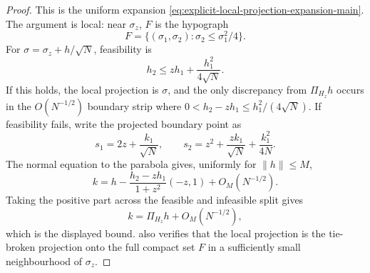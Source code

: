\begin{proof}
This is the uniform expansion
\eqref{eq:explicit-local-projection-expansion-main}.  The argument is local:
near \(\sigma_z\), \(F\) is the hypograph
\[
F=\{(\sigma_1,\sigma_2):\sigma_2\le \sigma_1^2/4\}.
\]
For \(\sigma=\sigma_z+h/\sqrt N\), feasibility is
\[
h_2\le zh_1+\frac{h_1^2}{4\sqrt N}.
\]
If this holds, the local projection is \(\sigma\), and the only discrepancy
from \(\Pi_{H_z}h\) occurs in the \(O(N^{-1/2})\) boundary strip where
\(0<h_2-zh_1\le h_1^2/(4\sqrt N)\).  If feasibility fails, write the projected
boundary point as
\[
s_1=2z+\frac{k_1}{\sqrt N},\qquad
s_2=z^2+\frac{zk_1}{\sqrt N}+\frac{k_1^2}{4N}.
\]
The normal equation to the parabola gives, uniformly for \(\|h\|\le M\),
\[
k
=h-\frac{h_2-zh_1}{1+z^2}(-z,1)+O_M(N^{-1/2}).
\]
Taking the positive part across the feasible and infeasible split gives
\[
k=\Pi_{H_z}h+O_M(N^{-1/2}),
\]
which is the displayed bound.  
also verifies that the local projection is the tie-broken projection onto the
full compact set \(F\) in a sufficiently small neighbourhood of \(\sigma_z\).
\end{proof}

\iffalse %

